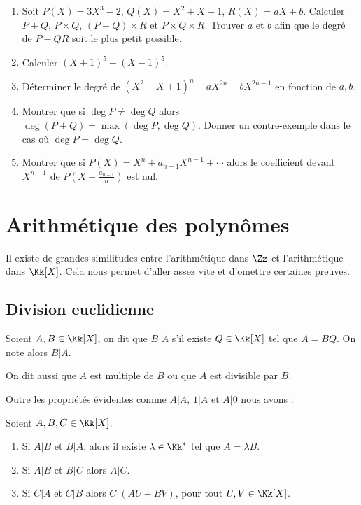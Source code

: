 \documentclass[class=report,crop=false]{standalone}
\begin{document}
\begin{miniexercices}
\sauteligne
\begin{enumerate}
  \item Soit $P(X)=3X^3-2$, $Q(X)=X^2+X-1$, $R(X)=aX+b$.
Calculer $P+Q$, $P\times Q$, $(P+Q)\times R$ et $P\times Q \times R$.
Trouver $a$ et $b$ afin que le degré de $P-QR$ soit le plus petit possible.

  \item Calculer $(X+1)^5-(X-1)^5$.

  \item Déterminer le degré de $(X^2+X+1)^n - aX^{2n}-bX^{2n-1}$ en fonction de $a,b$.

  \item Montrer que si $\deg P \neq \deg Q$ alors $\deg (P+Q)= \max(\deg P,\deg Q)$.
Donner un contre-exemple dans le cas où $\deg P = \deg Q$.

  \item Montrer que si $P(X)=X^n+a_{n-1}X^{n-1}+ \cdots$ alors le coefficient devant $X^{n-1}$ de
$P(X-\frac{a_{n-1}}{n})$ est nul.
\end{enumerate}
\end{miniexercices}

\section{Arithmétique des polynômes}

Il existe de grandes similitudes entre l'arithmétique dans $\Zz$ et
l'arithmétique dans $\Kk[X]$. Cela nous permet d'aller assez vite
et d'omettre certaines preuves.

\subsection{Division euclidienne}

\begin{definition}
Soient $A,B \in\Kk[X]$, on dit que $B$  $A$ s'il existe  $Q\in\Kk[X]$ tel que $A=BQ$.
On note alors $B|A$.
\end{definition}

On dit aussi que $A$ est multiple de $B$ ou que $A$ est divisible par $B$.

Outre les propriétés évidentes comme $A|A$, $1|A$ et $A|0$ nous avons :
\begin{proposition}
Soient $A,B, C\in\Kk[X]$.
\begin{enumerate}
\item Si $A|B$ et $B|A$, alors il existe $\lambda \in\Kk^*$ tel que
  $A=\lambda B$.
\item Si $A|B$ et $B|C$ alors $A|C$.
\item Si $C|A$ et $C|B$ alors  $C|(AU+BV)$, pour tout $U,V \in\Kk[X]$.
\end{enumerate}
\end{proposition}
\end{document}
